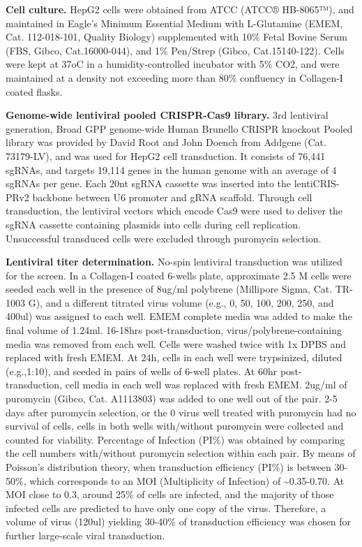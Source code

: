 \documentclass[
  legalpaperpaper,
]{article}
\begin{document}
\textbf{Cell culture.}
HepG2 cells were obtained from ATCC (ATCC® HB-8065™), and maintained in Eagle's Minimum Essential Medium with L-Glutamine (EMEM, Cat. 112-018-101, Quality Biology) supplemented with 10\% Fetal Bovine Serum (FBS, Gibco, Cat.16000-044), and 1\% Pen/Strep (Gibco, Cat.15140-122).
Cells were kept at 37oC in a humidity-controlled incubator with 5\% CO2, and were maintained at a density not exceeding more than 80\% confluency in Collagen-I coated flasks.

\textbf{Genome-wide lentiviral pooled CRISPR-Cas9 library.}
3rd lentiviral generation, Broad GPP genome-wide Human Brunello CRISPR knockout Pooled library was provided by David Root and John Doench from Addgene (Cat. 73179-LV), and was used for HepG2 cell transduction.
It consists of 76,441 sgRNAs, and targets 19,114 genes in the human genome with an average of 4 sgRNAs per gene.
Each 20nt sgRNA cassette was inserted into the lentiCRIS-PRv2 backbone between U6 promoter and gRNA scaffold.
Through cell transduction, the lentiviral vectors which encode Cas9 were used to deliver the sgRNA cassette containing plasmids into cells during cell replication.
Unsuccessful transduced cells were excluded through puromycin selection.

\textbf{Lentiviral titer determination.}
No-spin lentiviral transduction was utilized for the screen.
In a Collagen-I coated 6-wells plate, approximate 2.5 M cells were seeded each well in the presence of 8ug/ml polybrene (Millipore Sigma, Cat. TR-1003 G), and a different titrated virus volume (e.g., 0, 50, 100, 200, 250, and 400ul) was assigned to each well.
EMEM complete media was added to make the final volume of 1.24ml.
16-18hrs post-transduction, virus/polybrene-containing media was removed from each well.
Cells were washed twice with 1x DPBS and replaced with fresh EMEM.
At 24h, cells in each well were trypsinized, diluted (e.g.,1:10), and seeded in pairs of wells of 6-well plates.
At 60hr post-transduction, cell media in each well was replaced with fresh EMEM.
2ug/ml of puromycin (Gibco, Cat. A1113803) was added to one well out of the pair.
2-5 days after puromycin selection, or the 0 virus well treated with puromycin had no survival of cells, cells in both wells with/without puromycin were collected and counted for viability.
Percentage of Infection (PI\%) was obtained by comparing the cell numbers with/without puromycin selection within each pair.
By means of Poisson's distribution theory, when transduction efficiency (PI\%) is between 30-50\%, which corresponds to an MOI (Multiplicity of Infection) of \textasciitilde0.35-0.70.
At MOI close to 0.3, around 25\% of cells are infected, and the majority of those infected cells are predicted to have only one copy of the virus.
Therefore, a volume of virus (120ul) yielding 30-40\% of transduction efficiency was chosen for further large-scale viral transduction.
\end{document}
